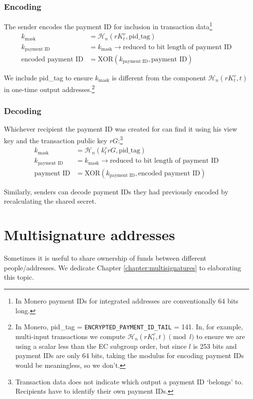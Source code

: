 \subsubsection*{Encoding}

The sender encodes the payment ID for inclusion in transaction data\footnote{In Monero payment IDs for integrated addresses are conventionally 64 bits long.}\vspace{.175cm}
\begin{align*}
         k_{\textrm{mask}} &= \mathcal{H}_n(r K_t^v,\textrm{pid\_tag}) \\
      k_{\textrm{payment ID}} &= k_{\textrm{mask}} \rightarrow \textrm{reduced to bit length of payment ID}\\
  \textrm{encoded payment ID} &= \textrm{XOR}(k_{\textrm{payment ID}}, \textrm{payment ID})
\end{align*}

We include pid\_tag to ensure $k_{\textrm{mask}}$ is different from the component $\mathcal{H}_n(r K_t^v, t)$ in one-time output addresses.\footnote{In Monero, pid\_tag = {\tt ENCRYPTED\_PAYMENT\_ID\_TAIL} = 141. In, for example, multi-input transactions we compute $\mathcal{H}_n(r K_t^v, t) \pmod l$ to ensure we are using a scalar less than the EC subgroup order, but since $l$ is 253 bits and payment IDs are only 64 bits, taking the modulus for encoding payment IDs would be meaningless, so we don't.}


\subsubsection*{Decoding}

Whichever recipient the payment ID was created for can find it using his view key and the transaction public key $r G$:\footnote{Transaction data does not indicate which output a payment ID `belongs' to. Recipients have to identify their own payment IDs.}\vspace{.175cm}
\begin{align*}
         k_{\textrm{mask}} &= \mathcal{H}_n(k_t^v r G,\textrm{pid\_tag}) \\
      k_{\textrm{payment ID}} &= k_{\textrm{mask}} \rightarrow \textrm{reduced to bit length of payment ID}\\
          \textrm{payment ID} &= \textrm{XOR}(k_{\textrm{payment ID}}, \textrm{encoded payment ID})
\end{align*}

Similarly, senders can decode payment IDs they had previously encoded by recalculating the shared secret.%



\section{Multisignature addresses}
\label{sec:multisignature-addresses}

Sometimes it is useful to share ownership of funds between different people/addresses. We dedicate Chapter \ref{chapter:multisignatures} to elaborating this topic.